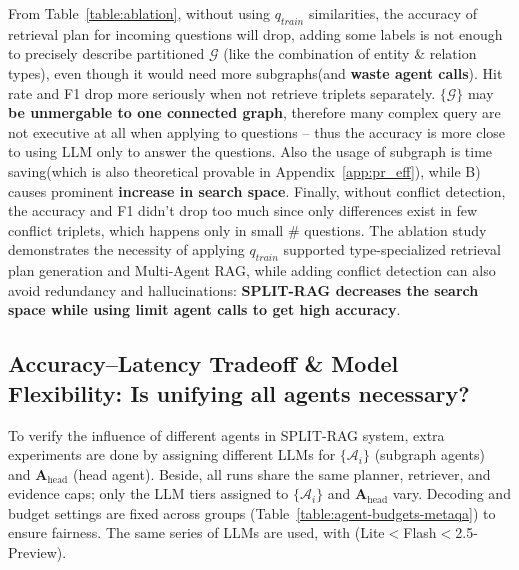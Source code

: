\documentclass[sigconf]{acmart}
\begin{document}
From Table~\ref{table:ablation}, without using $q_{train}$ similarities, the accuracy of retrieval plan for incoming questions will drop, adding some labels is not enough to precisely describe partitioned $\mathcal{G}$ (like the combination of entity \& relation types), even though it would need more subgraphs(and \textbf{waste agent calls}). Hit rate and F1 drop more seriously when not retrieve triplets separately. $\{\mathcal{G}\}$ may \textbf{be unmergable to one connected graph}, therefore many complex query are not executive at all when applying to questions -- thus the accuracy is more close to using LLM only to answer the questions. Also the usage of subgraph is time saving(which is also theoretical provable in Appendix~\ref{app:pr_eff}), while B) causes prominent \textbf{increase in search space}. Finally, without conflict detection, the accuracy and F1 didn't drop too much since only differences exist in few conflict triplets, which happens only in small \# questions. The ablation study demonstrates the necessity of applying $q_{train}$ supported type-specialized retrieval plan generation and Multi-Agent RAG, while adding conflict detection can also avoid redundancy and hallucinations: \textbf{SPLIT-RAG decreases the search space while using limit agent calls to get high accuracy}.

\subsection{Accuracy--Latency Tradeoff \& Model Flexibility: Is unifying all agents necessary?}
\label{section:diffAgent}



To verify the influence of different agents in SPLIT-RAG system, extra experiments are done by assigning different LLMs for \(\{\mathcal{A}_i\}\) (subgraph agents) and \(\mathbf{A}_{\text{head}}\) (head agent). Beside, all runs share the same planner, retriever, and evidence caps; only the LLM tiers assigned to \(\{\mathcal{A}_i\}\) and \(\mathbf{A}_{\text{head}}\) vary. Decoding and budget settings are fixed across groups (Table~\ref{table:agent-budgets-metaqa}) to ensure fairness. The same series of LLMs are used, with  (Lite$<$Flash$<$2.5-Preview).
\end{document}

